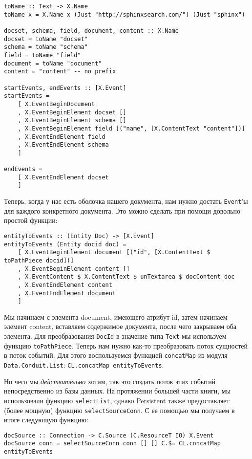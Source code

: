 \begin{lstlisting}
toName :: Text -> X.Name
toName x = X.Name x (Just "http://sphinxsearch.com/") (Just "sphinx")

docset, schema, field, document, content :: X.Name
docset = toName "docset"
schema = toName "schema"
field = toName "field"
document = toName "document"
content = "content" -- no prefix

startEvents, endEvents :: [X.Event]
startEvents =
    [ X.EventBeginDocument
    , X.EventBeginElement docset []
    , X.EventBeginElement schema []
    , X.EventBeginElement field [("name", [X.ContentText "content"])]
    , X.EventEndElement field
    , X.EventEndElement schema
    ]

endEvents =
    [ X.EventEndElement docset
    ]
\end{lstlisting}

Теперь, когда у нас есть оболочка нашего документа, нам нужно достать \lstinline!Event!'ы для каждого конкретного документа. Это можно сделать при помощи довольно простой функции:

\begin{lstlisting}
entityToEvents :: (Entity Doc) -> [X.Event]
entityToEvents (Entity docid doc) =
    [ X.EventBeginElement document [("id", [X.ContentText $ toPathPiece docid])]
    , X.EventBeginElement content []
    , X.EventContent $ X.ContentText $ unTextarea $ docContent doc
    , X.EventEndElement content
    , X.EventEndElement document
    ]
\end{lstlisting}
Мы начинаем с элемента document, имеющего атрибут id, затем начинаем элемент content, вставляем содержимое документа, после чего закрываем оба элемента. Для преобразования \lstinline!DocId! в значение типа \lstinline!Text! мы используем функцию \lstinline!toPathPiece!. Теперь нам нужно как-то преобразовать поток сущностей в поток событий. Для этого воспользуемся функцией \lstinline!concatMap! из модуля \lstinline!Data.Conduit.List!: \lstinline`CL.concatMap entityToEvents`.

Но чего мы \emph{действительно} хотим, так это создать поток этих событий непосредственно из базы данных. На протяжении большей части книги, мы использовали функцию \lstinline!selectList!, однако Persistent также предоставляет (более мощную) функцию \lstinline!selectSourceConn!. С ее помощью мы получаем в итоге следующую функцию: %

\begin{lstlisting}
docSource :: Connection -> C.Source (C.ResourceT IO) X.Event
docSource conn = selectSourceConn conn [] [] C.$= CL.concatMap entityToEvents
\end{lstlisting}%

